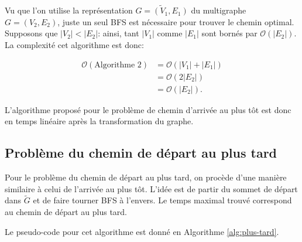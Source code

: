 Vu que l'on utilise la représentation $\tilde{G = (V_1,E_1)}$ du multigraphe
$G = (V_2,E_2)$, juste un seul BFS est nécessaire pour trouver le chemin
optimal. Supposons que $|V_2| < |E_2|$: ainsi, tant $|V_1|$ comme $|E_1|$ sont
bornés par $\mathcal{O}(|E_2|)$. La complexité cet algorithme est donc:

\begin{equation}
  \label{eq:10}
  \begin{align}
    \mathcal{O}(\text{Algorithme 2}) & = \mathcal{O}(|V_1| + |E_1|) \\
                                     & = \mathcal{O}(2 |E_{2}|) \\
                                     & = \mathcal{O}(|E_{2}|)\text{.}
  \end{align}
\end{equation}

L'algorithme proposé pour le problème de chemin d'arrivée au plus tôt est donc
en temps linéaire après la transformation du graphe.

\subsection{Problème du chemin de départ au plus tard}
\label{sec:plus-tard}

Pour le problème du chemin de départ au plus tard, on procède d'une manière
similaire à celui de l'arrivée au plus tôt. L'idée est de partir du sommet de
départ dans $\tilde{G}$ et de faire tourner BFS à l'envers. Le temps maximal
trouvé correspond au chemin de départ au plus tard.

Le pseudo-code pour cet algorithme est donné en Algorithme \ref{alg:plus-tard}.

